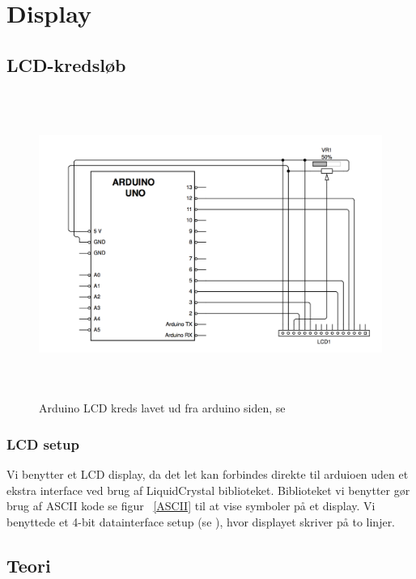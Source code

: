 \section{Display}

\subsection{LCD-kredsløb}
\begin{figure}[H]
	\centering
    \includegraphics[height=10cm]{figures/CIRCUITS/LCDFinal.png}
	\caption{Arduino LCD kreds lavet ud fra arduino siden, se \cite{arduinoLCD}}
	\label{arduinoLCD}
\end{figure}
\subsubsection{LCD setup}
Vi benytter et LCD display, da det let kan forbindes direkte til arduioen uden et ekstra interface ved brug af LiquidCrystal biblioteket. Biblioteket vi benytter gør brug af ASCII kode se figur ~\ref{ASCII} til at vise symboler på et display.
Vi benyttede et 4-bit datainterface setup (se \cite{arduinoLCD}), hvor displayet skriver på to linjer.




\subsection{Teori}
